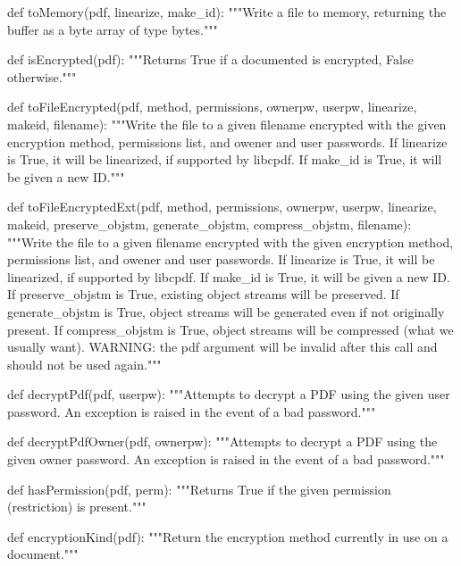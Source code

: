 def toMemory(pdf, linearize, make_id):
    """Write a file to memory, returning the buffer as a byte array of type
    bytes."""

def isEncrypted(pdf):
    """Returns True if a documented is encrypted, False otherwise."""

def toFileEncrypted(pdf, method, permissions, ownerpw, userpw, linearize,
                    makeid, filename):
    """Write the file to a given filename encrypted with the given encryption
    method, permissions list, and owener and user passwords. If linearize is
    True, it will be linearized, if supported by libcpdf. If make_id is True,
    it will be given a new ID."""

def toFileEncryptedExt(pdf, method, permissions, ownerpw, userpw, linearize,
                       makeid, preserve_objstm, generate_objstm,
                       compress_objstm, filename):
    """Write the file to a given filename encrypted with the given encryption
    method, permissions list, and owener and user passwords. If linearize is
    True, it will be linearized, if supported by libcpdf. If make_id is True,
    it will be given a new ID. If preserve_objstm is True, existing object
    streams will be preserved. If generate_objstm is True, object streams will
    be generated even if not originally present. If compress_objstm is True,
    object streams will be compressed (what we usually want). WARNING: the pdf
    argument will be invalid after this call and should not be used again."""

def decryptPdf(pdf, userpw):
    """Attempts to decrypt a PDF using the given user password. An exception is
    raised in the event of a bad password."""

def decryptPdfOwner(pdf, ownerpw):
    """Attempts to decrypt a PDF using the given owner password. An exception
    is raised in the event of a bad password."""

def hasPermission(pdf, perm):
    """Returns True if the given permission (restriction) is present."""

def encryptionKind(pdf):
    """Return the encryption method currently in use on a document."""
